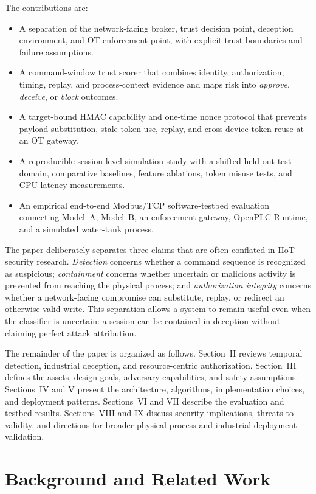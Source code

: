 \documentclass[journal]{IEEEtran}
\begin{document}
The contributions are:
\begin{itemize}
    \item A separation of the network-facing broker, trust decision point, deception environment, and OT enforcement point, with explicit trust boundaries and failure assumptions.
    \item A command-window trust scorer that combines identity, authorization, timing, replay, and process-context evidence and maps risk into \emph{approve}, \emph{deceive}, or \emph{block} outcomes.
    \item A target-bound HMAC capability and one-time nonce protocol that prevents payload substitution, stale-token use, replay, and cross-device token reuse at an OT gateway.
    \item A reproducible session-level simulation study with a shifted held-out test domain, comparative baselines, feature ablations, token misuse tests, and CPU latency measurements.
    \item An empirical end-to-end Modbus/TCP software-testbed evaluation connecting Model~A, Model~B, an enforcement gateway, OpenPLC Runtime, and a simulated water-tank process.
\end{itemize}

The paper deliberately separates three claims that are often conflated in IIoT security research. \emph{Detection} concerns whether a command sequence is recognized as suspicious; \emph{containment} concerns whether uncertain or malicious activity is prevented from reaching the physical process; and \emph{authorization integrity} concerns whether a network-facing compromise can substitute, replay, or redirect an otherwise valid write. This separation allows a system to remain useful even when the classifier is uncertain: a session can be contained in deception without claiming perfect attack attribution.

The remainder of the paper is organized as follows. Section~II reviews temporal detection, industrial deception, and resource-centric authorization. Section~III defines the assets, design goals, adversary capabilities, and safety assumptions. Sections~IV and V present the architecture, algorithms, implementation choices, and deployment patterns. Sections~VI and VII describe the evaluation and testbed results. Sections~VIII and IX discuss security implications, threats to validity, and directions for broader physical-process and industrial deployment validation.

\section{Background and Related Work}
\end{document}

